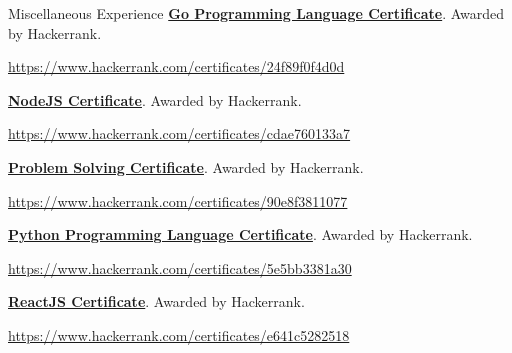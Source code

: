 \begin{rubric}{Miscellaneous Experience}
    \entry*[2021] \textbf{\href{https://www.hackerrank.com/certificates/24f89f0f4d0d}{Go Programming Language Certificate}}. Awarded by Hackerrank.
    \par \url{https://www.hackerrank.com/certificates/24f89f0f4d0d}

    \entry*[2021] \textbf{\href{https://www.hackerrank.com/certificates/cdae760133a7}{NodeJS Certificate}}. Awarded by Hackerrank.
    \par \url{https://www.hackerrank.com/certificates/cdae760133a7}

    \entry*[2021] \textbf{\href{https://www.hackerrank.com/certificates/90e8f3811077}{Problem Solving Certificate}}. Awarded by Hackerrank.
    \par \url{https://www.hackerrank.com/certificates/90e8f3811077}

    \entry*[2021] \textbf{\href{https://www.hackerrank.com/certificates/5e5bb3381a30}{Python Programming Language Certificate}}. Awarded by Hackerrank.
    \par \url{https://www.hackerrank.com/certificates/5e5bb3381a30}

    \entry*[2021] \textbf{\href{https://www.hackerrank.com/certificates/e641c5282518}{ReactJS Certificate}}. Awarded by Hackerrank.
    \par \url{https://www.hackerrank.com/certificates/e641c5282518}
\end{rubric}
